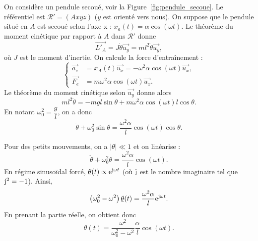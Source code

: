             On considère un pendule secoué, voir la Figure~\ref{fig:pendule_secoue}. Le référentiel est $\mathcal{R}'=(Axyz)$ ($y$ est orienté vers nous). On suppose que le pendule situé en $A$ est secoué selon l'axe x : $x_{a}(t)=\alpha\cos(\omega t)$. Le théorème du moment cinétique par rapport à $A$ dans $\mathcal{R}'$ donne 
            \begin{equation}
                \vec{L'_{A}}=J\dot{\theta}\vec{u_y}=ml^{2}\dot{\theta}\vec{u_y},
            \end{equation}
            où $J$ est le moment d'inertie. On calcule la force d'entraînement :
            \begin{equation}
                \left\lbrace
                \begin{aligned}
                    \vec{a_e} &=\ddot{x_A}(t)\vec{u_x}=-\omega^{2}\alpha\cos(\omega t)\vec{u_x},\\
                    \vec{F_e} &= m\omega^{2}\alpha\cos(\omega t)\vec{u_x}.
                \end{aligned}
                \right.
            \end{equation}
            Le théorème du moment cinétique selon $\vec{u_y}$ donne alors
            \begin{equation}
                ml^{2}\ddot{\theta}=-mgl\sin\theta+m\omega^{2}\alpha\cos(\omega t)l\cos\theta.
            \end{equation}
            En notant $\omega_{0}^{2}=\dfrac{g}{l}$, on a donc 
            \begin{equation}
                \boxed{
                    \ddot{\theta}+\omega_{0}^{2}\sin\theta=\frac{\omega^{2}\alpha}{l}\cos(\omega t)\cos\theta.
                }
            \end{equation}

            Pour des petits mouvements, on a $\left\lvert\theta\right\rvert\ll1$ et on linéarise :
            \begin{equation}
                \ddot{\theta}+\omega_{0}^{2}\theta=\frac{\omega^{2}\alpha}{l}\cos(\omega t).
            \end{equation}
            En régime sinusoïdal forcé, $\ubar{\theta}(t)\propto\rme^{\rmj \omega t}$ (où $\mathrm{j}$ est le nombre imaginaire tel que $\mathrm{j}^{2}=-1$). Ainsi,
            \begin{equation}
                \left(\omega_{0}^{2}-\omega^{2}\right)\ubar{\theta}(t)=\frac{\omega^{2}\alpha}{l}\rme^{\rmj\omega t}.
            \end{equation}
            En prenant la partie réelle, on obtient donc
            \begin{equation}
                \boxed{
                    \theta(t)=\frac{\omega^{2}}{\omega_{0}^{2}-\omega^{2}}\frac{\alpha}{l}\cos(\omega t).
                }
            \end{equation}

